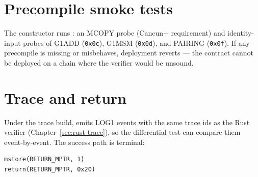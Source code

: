 \section{Precompile smoke tests}
\label{sec:sol-smoke}

The constructor runs : an MCOPY probe (Cancun+
requirement) and identity-input probes of G1ADD (\texttt{0x0c}), G1MSM
(\texttt{0x0d}), and PAIRING (\texttt{0x0f}). If any precompile is
missing or misbehaves, deployment reverts --- the contract cannot be
deployed on a chain where the verifier would be unsound.

\section{Trace and return}
\label{sec:sol-trace}

Under the trace build,  emits LOG1 events with the
same trace ids as the Rust verifier (Chapter~\ref{sec:rust-trace}), so
the differential test can compare them event-by-event. The success path
is terminal:
\begin{lstlisting}[style=yul]
mstore(RETURN_MPTR, 1)
return(RETURN_MPTR, 0x20)
\end{lstlisting}
